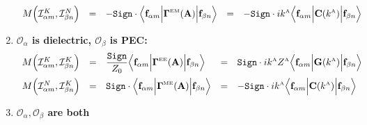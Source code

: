 \documentclass[dvips,letterpaper]{article}
\newcommand{\BG}{\boldsymbol{\Gamma}}
\begin{document}
\begin{enumerate}
$$\begin{array}{lclcl}
 M\Big( \mathcal{I}^K_{\alpha m}, \mathcal{I}^N_{\beta n} \Big) 
  &=&
  \displaystyle{ -\texttt{Sign}\cdot
                 \Big\langle 
                 \vb f_{\alpha m} 
                 \Big| \BG\supt{EM}(\vb A) \Big|
                 \vb f_{\beta n} 
                 \Big\rangle
               }
  &=&
  \displaystyle{ -\texttt{Sign}\cdot ik\supt{A}
                  \Big\langle 
                  \vb f_{\alpha m} 
                  \Big| \vb C(k\supt{A})\Big|
                  \vb f_{\beta n} 
                  \Big\rangle
               }
\end{array}$$
\item \textbf{ $\mathcal{O}_\alpha$ is dielectric, 
               $\mathcal{O}_\beta$ is PEC:}
$$\begin{array}{lclcl}
 M\Big( \mathcal{I}^K_{\alpha m}, \mathcal{I}^K_{\beta n} \Big) 
  &=& 
  \displaystyle{ \frac{\texttt{Sign}}{Z_0} 
                 \Big\langle \vb f_{\alpha m} 
                 \Big| \BG\supt{EE}(\vb A) \Big|
                 \vb f_{\beta n} 
                 \Big\rangle
               }
  &=&
  \displaystyle{ \texttt{Sign}\cdot ik\supt{A} Z\supt{A}
                 \Big\langle \vb f_{\alpha m} 
                 \Big| \vb G(k\supt{A}) \Big|
                 \vb f_{\beta n} 
                 \Big\rangle
               }
\\[10pt]
 M\Big( \mathcal{I}^N_{\alpha m}, \mathcal{I}^K_{\beta n} \Big) 
  &=&
  \displaystyle{ \texttt{Sign}\cdot
                 \Big\langle 
                 \vb f_{\alpha m} 
                 \Big| \BG\supt{ME}(\vb A) \Big|
                 \vb f_{\beta n} 
                 \Big\rangle
               }
  &=&
  \displaystyle{ -\texttt{Sign}\cdot ik\supt{A}
                  \Big\langle 
                  \vb f_{\alpha m} 
                  \Big| \vb C(k\supt{A})\Big|
                  \vb f_{\beta n} 
                  \Big\rangle
               }
\end{array}$$
\item \textbf{ $\mathcal{O}_\alpha, \mathcal{O}_\beta$ are both
}
\end{enumerate}
\end{document}
